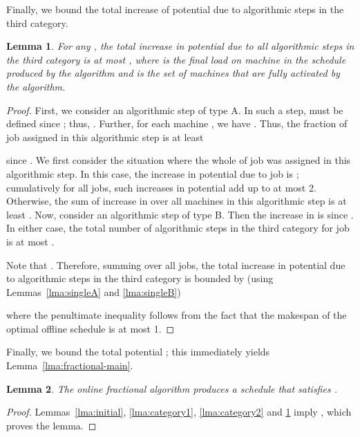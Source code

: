 \documentclass[11pt]{article}
\newtheorem{lemma}{Lemma}
\begin{document}
\noindent
Finally, we bound the total increase of potential due to algorithmic 
steps in the third category.
\begin{lemma}
\label{lma:category3}
For any ,
the total increase in potential due to all algorithmic steps in the third 
category is at most , 
where  is the final load on machine  in the schedule produced
by the algorithm and  is the set of machines that are fully 
activated by the algorithm.
\end{lemma}
\begin{proof}
First,
we consider an algorithmic step of type A. In such a step,  must 
be defined since ; thus,
. Further, for each machine
, we have 
.
Thus, the fraction of job  assigned in this algorithmic step is at least

since .
We first consider the situation where the whole of job  was assigned 
in this algorithmic step. In this case, the increase in potential due
to job  is 
; cumulatively for
all jobs, such increases in potential add up to at most 2.
Otherwise, the sum of increase in  over all machines in 
this algorithmic step is at least . 
Now, consider an algorithmic step of type B.
Then the increase in  is  
since . In either case, 
the total number of algorithmic steps in the third category
for job  is at most . 

Note that .
Therefore, summing over all jobs, the total increase in potential 
due to algorithmic steps in the third category is bounded by 
(using Lemmas~\ref{lma:singleA} and \ref{lma:singleB})

where the penultimate inequality follows from the fact that the
makespan of the optimal offline schedule is at most 1.
\end{proof}
\noindent
Finally, we bound the total potential ; this immediately yields
Lemma~\ref{lma:fractional-main}.
\begin{lemma}
The online fractional algorithm produces a schedule that satisfies 
.
\end{lemma}
\begin{proof}
Lemmas~\ref{lma:initial}, \ref{lma:category1}, 
\ref{lma:category2} and \ref{lma:category3} imply
,
which proves the lemma.
\end{proof}
\end{document}
